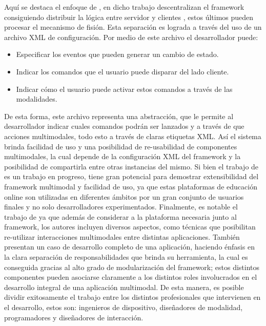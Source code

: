 Aquí se destaca el enfoque de \citet{cutugno2012multimodal}, en dicho trabajo descentralizan el framework consiguiendo distribuir la lógica entre servidor y clientes \ie, estos últimos pueden procesar el mecanismo de fisión. Esta separación es lograda a través del uso de un archivo XML de configuración. Por medio de este archivo el desarrollador puede:
\begin{itemize}
\item
Especificar los eventos que pueden generar un cambio de estado.
\item
Indicar los comandos que el usuario puede disparar del lado cliente.
\item
Indicar cómo el usuario puede activar estos comandos a través de las modalidades.
\end{itemize}
De esta forma, este archivo representa una abstracción, que le permite al desarrollador indicar cuales comandos podrán ser lanzados y a través de que acciones multimodales, todo esto a través de claras etiquetas XML. Así el sistema brinda facilidad de uso y una posibilidad de re-usabilidad de componentes multimodales, la cual depende de la configuración XML del framework y la posibilidad de compartirla entre otras instancias del mismo. Si bien el trabajo de \citet{da2013learning} es un trabajo en progreso, tiene gran potencial para demostrar extensibilidad del framework multimodal y facilidad de uso, ya que estas plataformas de educación online son utilizadas en diferentes ámbitos por un gran conjunto de usuarios finales y no solo desarrolladores experimentados.
Finalmente, es notable el trabajo de \citet*{lo2013chameleon} ya que además de considerar a la plataforma necesaria junto al framework, los autores incluyen diversos aspectos, como técnicas que posibilitan re-utilizar interacciones multimodales entre distintas aplicaciones. También presentan un caso de desarrollo completo de una aplicación, haciendo énfasis en la clara separación de responsabilidades que brinda su herramienta, la cual es conseguida gracias al alto grado de modularización del framework; estos distintos componentes pueden asociarse claramente a los distintos roles involucrados en el desarrollo integral de una aplicación multimodal. De esta manera, es posible dividir exitosamente el trabajo entre los distintos profesionales que intervienen en el desarrollo, estos son: ingenieros de dispositivo, diseñadores de modalidad, programadores y diseñadores de interacción.

